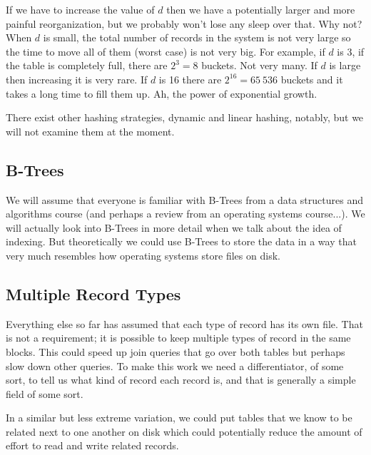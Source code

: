 \documentclass[a4paper]{report}
\begin{document}
If we have to increase the value of $d$ then we have a potentially larger and more painful reorganization, but we probably won't lose any sleep over that. Why not? When $d$ is small, the total number of records in the system is not very large so the time to move all of them (worst case) is not very big. For example, if $d$ is 3, if the table is completely full, there are $2^{3} = 8$ buckets. Not very many. If $d$ is large then increasing it is very rare. If $d$ is 16 there are $2^{16} = 65~536$ buckets and it takes a long time to fill them up. Ah, the power of exponential growth.


There exist other hashing strategies, dynamic and linear hashing, notably, but we will not examine them at the moment.

\subsection*{B-Trees}

We will assume that everyone is familiar with B-Trees from a data structures and algorithms course (and perhaps a review from an operating systems course...). We will actually look into B-Trees in more detail when we talk about the idea of indexing. But theoretically we could use B-Trees to store the data in a way that very much resembles how operating systems store files on disk.


\subsection*{Multiple Record Types}

Everything else so far has assumed that each type of record has its own file. That is not a requirement; it is possible to keep multiple types of record in the same blocks. This could speed up join queries that go over both tables but perhaps slow down other queries. To make this work we need a differentiator, of some sort, to tell us what kind of record each record is, and that is generally a simple field of some sort.

In a similar but less extreme variation, we could put tables that we know to be related next to one another on disk which could potentially reduce the amount of effort to read and write related records.
\end{document}
